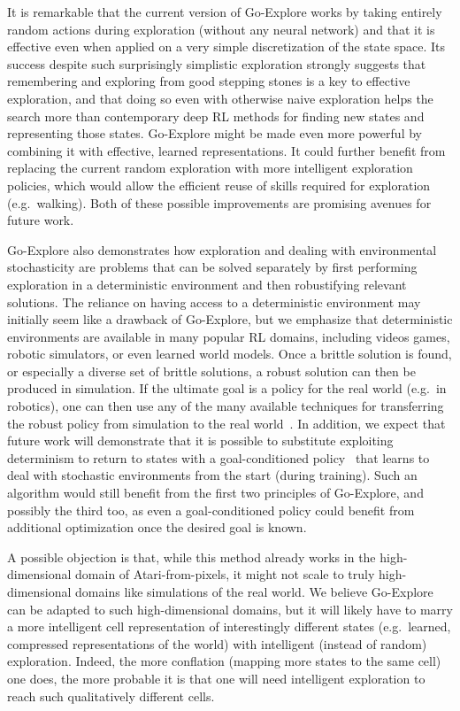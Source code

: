 \documentclass{article}
\begin{document}
It is remarkable that the current version of Go-Explore works by taking entirely random actions during exploration (without any neural network) and that it is effective even when applied on a very simple discretization of the state space. Its success despite such surprisingly simplistic exploration strongly suggests that remembering and exploring from good stepping stones is a key to effective exploration, and that doing so even with otherwise naive exploration helps the search more than contemporary deep RL methods for finding new states and representing those states. Go-Explore might be made even more powerful by combining it with effective, learned representations. It could further benefit from replacing the current random exploration with more intelligent exploration policies, which would allow the efficient reuse of skills required for exploration (e.g.\ walking). Both of these possible improvements are promising avenues for future work.

Go-Explore also demonstrates how exploration and dealing with environmental stochasticity are problems that can be solved separately by first performing exploration in a deterministic environment and then robustifying relevant solutions. The reliance on having access to a deterministic environment may initially seem like a drawback of Go-Explore, but we emphasize that deterministic environments are available in many popular RL domains, including videos games, robotic simulators, or even learned world models. Once a brittle solution is found, or especially a diverse set of brittle solutions, a robust solution can then be produced in simulation. If the ultimate goal is a policy for the real world (e.g.\ in robotics), one can then use any of the many available techniques for transferring the robust policy from simulation to the real world~\cite{cully:nature15,koos2013transferability,tobin2017domain}. In addition, we expect that future work will demonstrate that it is possible to substitute exploiting determinism to return to states with a goal-conditioned policy~\cite{andrychowicz2017hindsight,schaul2015universal} that learns to deal with stochastic environments from the start (during training). Such an algorithm would still benefit from the first two principles of Go-Explore, and possibly the third too, as even a goal-conditioned policy could benefit from additional optimization once the desired goal is known.

A possible objection is that, while this method already works in the high-dimensional domain of Atari-from-pixels, it might not scale to truly high-dimensional domains like simulations of the real world. We believe Go-Explore can be adapted to such high-dimensional domains, but it will likely have to marry a more intelligent cell representation of interestingly different states (e.g.\ learned, compressed representations of the world) with intelligent (instead of random) exploration. Indeed, the more conflation (mapping more states to the same cell) one does, the more probable it is that one will need intelligent exploration to reach such qualitatively different cells.
\end{document}
